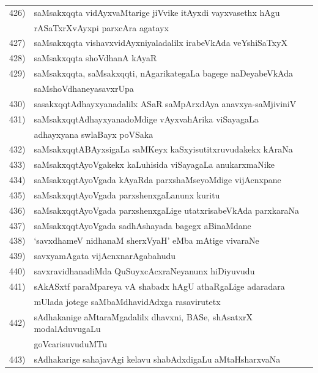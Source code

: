 {\begin{longtable}{@{}cp{7.4cm}r}
426) & saMsakxqqta vidAyxvaMtarige jiVvike itAyxdi vayxvasethx hAgu & \\
     & rASaTxrXvAyxpi parxcAra agatayx & \pageref{page46}\\
427) & saMsakxqqta vishavxvidAyxniyaladalilx irabeVkAda veYshiSaTxyX & \pageref{page37}\\
428) &  saMsakxqqta shoVdhanA kAyaR & \pageref{page53}\\
429) & saMsakxqqta, saMsakxqqti, nAgarikategaLa bagege naDeyabeVkAda & \\
     & saMshoVdhaneyasavxrUpa & \pageref{page53}\\
430) & sasakxqqtAdhayxyanadalilx ASaR saMpArxdAya anavxya-saMjiviniV & \pageref{page45} \\
431) & saMsakxqqtAdhayxyanadoMdige vAyxvahArika viSayagaLa  & \\
     & adhayxyana swlaBayx poVSaka & \pageref{page47}\\
432) & saMsakxqqtABAyxsigaLa saMKeyx kaSxyisutitxruvudakekx kAraNa & \pageref{page45}\\
433) & saMsakxqqtAyoVgakekx kaLuhisida viSayagaLa anukarxmaNike & \pageref{page20}\\
434) & saMsakxqqtAyoVgada kAyaRda parxshaMseyoMdige vijAcnxpane & \pageref{page21}\\
435) & saMsakxqqtAyoVgada parxshenxgaLanunx kuritu & \pageref{page29}\\ 
436) & saMsakxqqtAyoVgada parxshenxgaLige utatxrisabeVkAda parxkaraNa & \pageref{page19}\\
437) & saMsakxqqtAyoVgada sadhAshayada bagegx aBinaMdane & \pageref{page29}\\
438) & `savxdhameV nidhanaM sherxVyaH' eMba mAtige vivaraNe & \pageref{page197}\\
439) & savxyamAgata vijAcnxnarAgabahudu & \pageref{page107}\\
440) & savxravidhanadiMda QuSuyxcAcxraNeyanunx hiDiyuvudu & \pageref{page122}\\
441) & sAkASxtf paraMpareya vA shabadx hAgU athaRgaLige adaradara & \\
     & mUlada jotege saMbaMdhavidAdxga rasavirutetx & \pageref{page181}\\
442) & sAdhakanige aMtaraMgadalilx dhavxni, BASe, shAsatxrX modalAduvugaLu & \\
     & goVcarisuvuduMTu  & \pageref{page189}\\
 443) & sAdhakarige sahajavAgi kelavu shabAdxdigaLu aMtaHsharxvaNa & \\

\end{longtable}}

